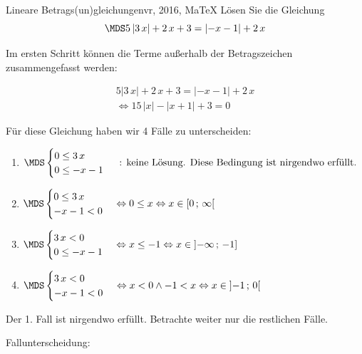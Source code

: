  \providecommand{\MoIl}[1][]{\mbox{}#1]\mathopen{}} 
 \providecommand{\MoIr}[1][]{#1[\mbox{}} 
 \providecommand{\MIntvlSep}{;} 
 \providecommand{\MElSetSep}{\, ; \, } 
 \begin{MAufgabe}{Lineare Betrags(un)gleichungen}{vr, 2016, MaTeX}
L\"osen Sie die Gleichung
$$
 \MDS 5\left| 3\, x \right|+2\, x + 3=  \left|  - x - 1 \right| +2\, x
$$  

\ifLsg\MLoesung

Im ersten Schritt k\"onnen die Terme au\ss{}erhalb der Betragszeichen zusammengefasst werden:

\begin{align*} 
 5\left| 3\, x \right|+2\, x + 3=  \left|  - x - 1 \right| +2\, x\\ 
\Leftrightarrow15\, \left|x\right| - \left|x + 1\right| + 3= 0 
 \end{align*}

F\"ur diese Gleichung haben wir 4 F\"alle zu unterscheiden: 
\begin{enumerate}
\item $ \MDS 
\begin{cases} 
 0 \leq 3\, x\\ 
0 \leq  - x - 1
 \end{cases}
 \mbox{ : keine L\"osung. Diese Bedingung ist nirgendwo erf\"ullt.}$ 
\item $ \MDS 
\begin{cases} 
 0 \leq 3\, x\\ 
 - x - 1 < 0
 \end{cases}
\Leftrightarrow 0 \leq x\Leftrightarrow x \in [ 0 \, \MIntvlSep \, \infty\MoIr $ 
\item $ \MDS 
\begin{cases} 
 3\, x < 0\\ 
0 \leq  - x - 1
 \end{cases}
\Leftrightarrow x \leq -1\Leftrightarrow x \in \MoIl  -\infty \, \MIntvlSep \, -1]$ 
\item $ \MDS 
\begin{cases} 
 3\, x < 0\\ 
 - x - 1 < 0
 \end{cases}
\Leftrightarrow x < 0 \wedge -1 < x\Leftrightarrow x \in \MoIl  -1 \, \MIntvlSep \, 0\MoIr $ 
\end{enumerate} 
Der 1. Fall ist nirgendwo erf\"ullt. Betrachte weiter nur die restlichen F\"alle.
 
 Fallunterscheidung: 


\end{MAufgabe}
